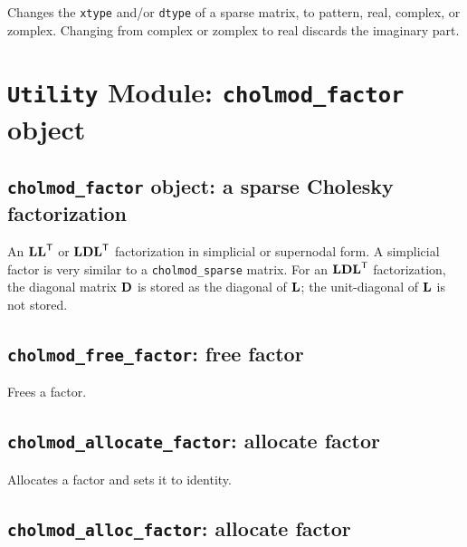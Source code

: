 \documentclass[11pt]{article}
\newcommand{\m}[1]{{\bf{#1}}}       %
\newcommand{\tr}{^{\sf T}}          %
\begin{document}

Changes the {\tt xtype} and/or \verb'dtype' of a sparse matrix, to pattern,
real, complex, or zomplex.  Changing from complex or zomplex to real discards
the imaginary part.

\newpage \section{{\tt Utility} Module: {\tt cholmod\_factor} object}
\label{cholmod_factor}

\subsection{{\tt cholmod\_factor} object: a sparse Cholesky factorization}


An $\m{LL}\tr$ or $\m{LDL}\tr$ factorization in simplicial or supernodal form.
A simplicial factor is very similar to a {\tt cholmod\_sparse} matrix.
For an $\m{LDL}\tr$ factorization, the diagonal matrix $\m{D}$ is stored
as the diagonal of $\m{L}$; the unit-diagonal of $\m{L}$ is not stored.

\subsection{{\tt cholmod\_free\_factor}: free factor}


Frees a factor.

\subsection{{\tt cholmod\_allocate\_factor}: allocate factor}


Allocates a factor and sets it to identity.

\subsection{{\tt cholmod\_alloc\_factor}: allocate factor}
\end{document}
